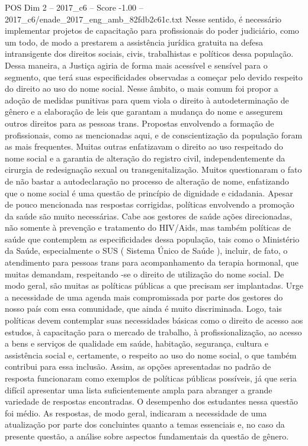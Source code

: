 \begin{textsample}{POS Dim 2 – 2017\_c6 – Score -1.00 – 2017\_c6/enade\_2017\_eng\_amb\_82fdb2c61c.txt}
Nesse sentido, é necessário implementar projetos de capacitação para profissionais do poder judiciário, como um todo, de modo a prestarem a assistência jurídica gratuita na defesa intransigente dos direitos sociais, civis, trabalhistas e políticos dessa população.
Dessa maneira, a Justiça agiria de forma mais acessível e sensível para o segmento, que terá suas especificidades observadas a começar pelo devido respeito do direito ao uso do nome social.
Nesse âmbito, o mais comum foi propor a adoção de medidas punitivas para quem viola o direito à autodeterminação de gênero e a elaboração de leis que garantam a mudança do nome e assegurem outros direitos para as pessoas trans.
Propostas envolvendo a formação de profissionais, como as mencionadas aqui, e de conscientização da população foram as mais frequentes.
Muitas outras enfatizavam o direito ao uso respeitado do nome social e a garantia de alteração do registro civil, independentemente da cirurgia de redesignação sexual ou transgenitalização.
Muitos questionaram o fato de não bastar a autodeclaração no processo de alteração de nome, enfatizando que o nome social é uma questão de princípio de dignidade e cidadania.
Apesar de pouco mencionada nas respostas corrigidas, políticas envolvendo a promoção da saúde são muito necessárias.
Cabe aos gestores de saúde ações direcionadas, não somente à prevenção e tratamento do HIV/Aids, mas também políticas de saúde que contemplem as especificidades dessa população, tais como o Ministério da Saúde, especialmente o SUS ( Sistema Único de Saúde ), incluir, de fato, o atendimento para pessoas trans para acompanhamento da terapia hormonal, que muitas demandam, respeitando -se o direito de utilização do nome social.
De modo geral, são muitas as políticas públicas a que precisam ser implantadas.
Urge a necessidade de uma agenda mais compromissada por parte dos gestores do nosso país com essa comunidade, que ainda é muito discriminada.
Logo, tais políticas devem contemplar suas necessidades básicas como o direito de acesso aos estudos, à capacitação para o mercado de trabalho, à profissionalização, ao acesso a bens e serviços de qualidade em saúde, habitação, segurança, cultura e assistência social e, certamente, o respeito ao uso do nome social, o que também contribui para essa inclusão.
Assim, as opções apresentadas no padrão de resposta funcionaram como exemplos de políticas públicas possíveis, já que seria difícil apresentar uma lista suficientemente ampla para abranger a grande variedade de respostas encontradas.
O desempenho dos estudantes nessa questão foi médio.
As respostas, de modo geral, indicaram a necessidade de uma atualização por parte dos concluintes quanto a temas essenciais e, no caso da presente questão, a análise sobre aspectos fundamentais da questão de gênero.

\end{textsample}
